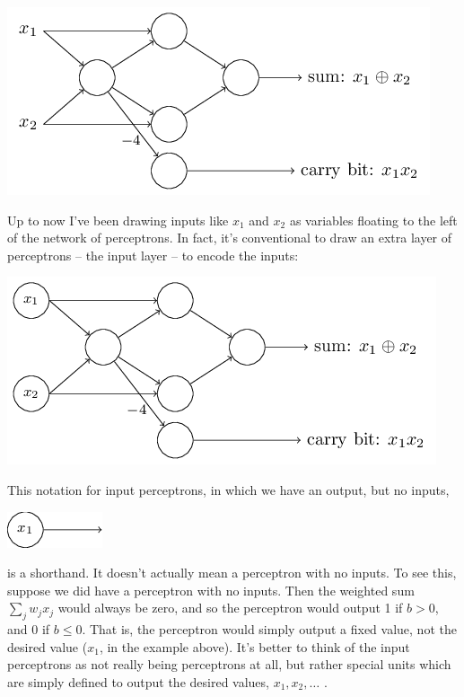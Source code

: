 \documentclass[a4paper,twoside,10pt]{book}
\begin{document}
\begin{center}
	\includegraphics[scale=0.5]{./figures/ch1/tikz5}
\end{center}		
Up to now I've been drawing inputs like $x_1$ and $x_2$ as variables floating to the left of the network of perceptrons. In fact, it's conventional to draw an extra layer of perceptrons -- the input layer -- to encode the inputs:
\begin{center}
	\includegraphics[scale=0.5]{./figures/ch1/tikz6}
\end{center}		
This notation for input perceptrons, in which we have an output, but no inputs,
\begin{center}
	\includegraphics[scale=0.5]{./figures/ch1/tikz7}
\end{center}	
is a shorthand. It doesn't actually mean a perceptron with no inputs. To see this, suppose we did have a perceptron with no inputs. Then the weighted sum $\sum_jw_jx_j$ would always be zero, and so the perceptron would output 1 if $b>0$, and 0 if $b\le0$. That is, the perceptron would simply output a fixed value, not the desired value ($x_1$, in the example above). It's better to think of the input perceptrons as not really being perceptrons at all, but rather special units which are simply defined to output the desired values, $x_1,x_2,\ldots$ .
\end{document}
